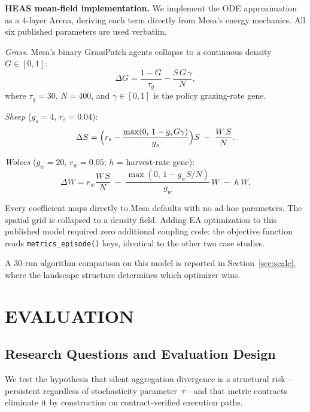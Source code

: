 \documentclass{wscpaperproc}
\begin{document}
\textbf{HEAS mean-field implementation.} We implement the ODE approximation as a
4-layer Arena, deriving each term directly from Mesa's energy mechanics.
All six published parameters are used verbatim.

\textit{Grass.} Mesa's binary GrassPatch agents collapse to a continuous
density $G\in[0,1]$:
\begin{equation}
  \Delta G = \frac{1-G}{\tau_g} - \frac{S\,G\,\gamma}{N},
  \label{eq:grass}
\end{equation}
where $\tau_g\!=\!30$, $N\!=\!400$, and $\gamma\!\in\![0,1]$ is the policy
grazing-rate gene.

\textit{Sheep} ($g_s\!=\!4$, $r_s\!=\!0.04$):
\begin{equation}
  \Delta S = \Bigl(r_s - \frac{\max(0,\,1-g_s G\gamma)}{g_s}\Bigr)S
             \;-\; \frac{W\,S}{N}.
  \label{eq:sheep}
\end{equation}

\textit{Wolves} ($g_w\!=\!20$, $r_w\!=\!0.05$; $h$ = harvest-rate gene):
\begin{equation}
  \Delta W = r_w \frac{W\,S}{N}
             \;-\; \frac{\max(0,\,1-g_w S/N)}{g_w}\,W
             \;-\; h\,W.
  \label{eq:wolf}
\end{equation}

Every coefficient maps directly to Mesa defaults with no ad-hoc parameters. The
spatial grid is collapsed to a density field. Adding EA optimization to this
published model required zero additional coupling code: the objective function
reads \texttt{metrics\_episode()} keys, identical to the other two case studies.

A 30-run algorithm comparison on this model is reported in Section~\ref{sec:scale},
where the landscape structure determines which optimizer wins.

\section{EVALUATION}

\subsection{Research Questions and Evaluation Design}

We test the hypothesis that silent aggregation divergence is a structural
risk---persistent regardless of stochasticity parameter~$\tau$---and that metric
contracts eliminate it by construction on contract-verified execution paths.
\end{document}
